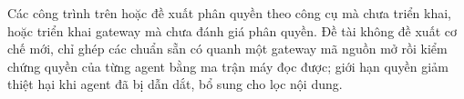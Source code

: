 Các công trình trên hoặc đề xuất phân quyền theo công cụ mà chưa triển khai, hoặc triển khai gateway mà chưa đánh giá phân quyền. Đề tài không đề xuất cơ chế mới, chỉ ghép các chuẩn sẵn có quanh một gateway mã nguồn mở rồi kiểm chứng quyền của từng agent bằng ma trận máy đọc được; giới hạn quyền giảm thiệt hại khi agent đã bị dẫn dắt, bổ sung cho lọc nội dung.